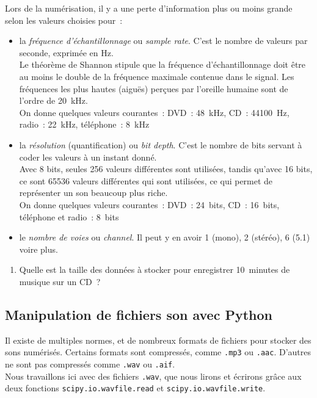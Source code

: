 \documentclass[10pt,fleqn]{article} %
\begin{document}
\begin{multicols}{2}
Lors de la numérisation, il y a une perte d'information plus ou moins
grande selon les valeurs choisies pour~: 
\begin{itemize}
\item 
  la \emph{fréquence d'échantillonnage} ou \emph{sample rate}. C'est le
  nombre de valeurs par seconde, exprimée en Hz. \\
  Le théorème de Shannon stipule que la fréquence d'échantillonnage doit
  être au moins le double de la fréquence maximale contenue dans le
  signal. Les fréquences les plus hautes (aiguës) perçues par l'oreille
  humaine sont de l'ordre de 20~kHz. \\
  On donne quelques valeurs courantes~: DVD~: 48~kHz, CD~: 44100~Hz,
  radio~: 22~kHz, téléphone~: 8~kHz  
  
\item 
  la \emph{résolution} (quantification) ou \emph{bit depth}. C'est le nombre de bits
  servant à coder les valeurs à un instant donné. \\
  Avec 8 bits, seules 256 valeurs différentes sont utilisées, tandis
  qu'avec 16 bits, ce sont 65536 valeurs différentes qui sont
  utilisées, ce qui permet de représenter un son beaucoup plus riche. 
  \\
  On donne quelques valeurs courantes~: DVD~: 24~bits, CD~: 16~bits,
  téléphone et radio~: 8~bits 
\item 
  le \emph{nombre de voies} ou \emph{channel}. Il peut y en avoir 1 (mono), 2
  (stéréo), 6 (5.1) voire plus. 
\end{itemize}

\begin{enumerate}
\item 
  Quelle est la taille des données à stocker pour enregistrer
  10~minutes de musique sur un CD~? 
\end{enumerate}




\subsection*{Manipulation de fichiers son avec Python}

Il existe de multiples normes, et de nombreux formats de fichiers pour
stocker des sons numérisés. Certains formats sont compressés, comme
\texttt{.mp3} ou \texttt{.aac}. D'autres ne sont pas compressés
comme \texttt{.wav} ou \texttt{.aif}. \\
Nous travaillons ici avec des fichiers \texttt{.wav}, que nous lirons
et écrirons grâce aux deux fonctions \verb#scipy.io.wavfile.read# et
\verb#scipy.io.wavfile.write#. 


\end{multicols}
\end{document}
